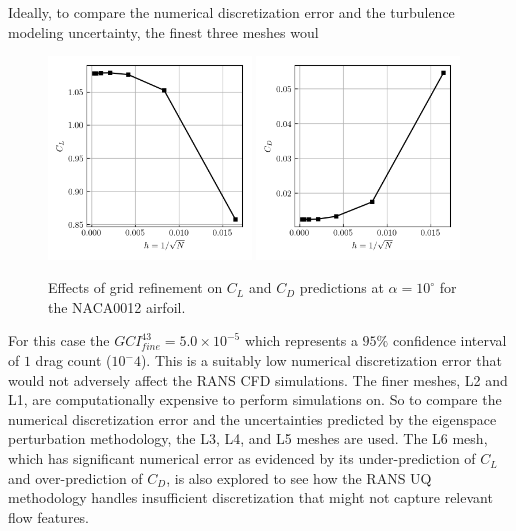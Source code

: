 Ideally, to compare the numerical discretization error and the turbulence modeling uncertainty, the finest three meshes woul

\begin{figure}
\center
\subfigure%
  {\includegraphics[width=0.48\textwidth]{code/image_gen/naca0012/images/naca0012_CL_tmr_mesh_convergence.png}}
\subfigure%
  {\includegraphics[width=0.48\textwidth]{code/image_gen/naca0012/images/naca0012_CD_tmr_mesh_convergence.png}}
\caption{Effects of grid refinement on $C_L$ and $C_D$ predictions at $\alpha = 10^\circ$ for the NACA0012 airfoil.}\label{fig:naca0012_mesh_convergence}
\end{figure}

For this case the $GCI_{fine}^{43} = 5.0 \times 10^{-5}$ which represents a $95\%$ confidence interval of $1$ drag count ($10^-4$). 
This is a suitably low numerical discretization error that would not adversely affect the RANS CFD simulations. 
The finer meshes, L2 and L1, are computationally expensive to perform simulations on.
So to compare the numerical discretization error and the uncertainties predicted by the eigenspace perturbation methodology, the L3, L4, and L5 meshes are used. 
The L6 mesh, which has significant numerical error as evidenced by its under-prediction of $C_L$ and over-prediction of $C_D$, is also explored to see how the RANS UQ methodology handles insufficient discretization that might not capture relevant flow features. 

